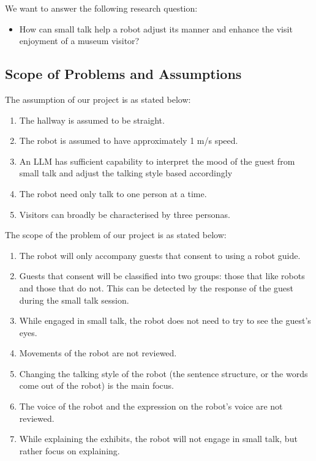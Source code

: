 We want to answer the following research question:
\begin{itemize}
    \item How can small talk help a robot adjust its manner and enhance the visit enjoyment of a museum visitor?
\end{itemize}

\subsection{Scope of Problems and Assumptions}

The assumption of our project is as stated below:
\begin{enumerate}
    \item The hallway is assumed to be straight.
    \item The robot is assumed to have approximately 1 m/s speed.
    \item An LLM has sufficient capability to interpret the mood of the guest from small talk and adjust the talking style based accordingly
    \item The robot need only talk to one person at a time.
    \item Visitors can broadly be characterised by three personas.
\end{enumerate}

The scope of the problem of our project is as stated below:
\begin{enumerate}
    \item The robot will only accompany guests that consent to using a robot guide.
    \item Guests that consent will be classified into two groups: those that like robots and those that do not. This can be detected by the response of the guest during the small talk session.
    \item While engaged in small talk, the robot does not need to try to see the guest's eyes.
    \item Movements of the robot are not reviewed.
    \item Changing the talking style of the robot (the sentence structure, or the words come out of the robot) is the main focus.
    \item The voice of the robot and the expression on the robot's voice are not reviewed.
    \item While explaining the exhibits, the robot will not engage in small talk, but rather focus on explaining.
\end{enumerate}

